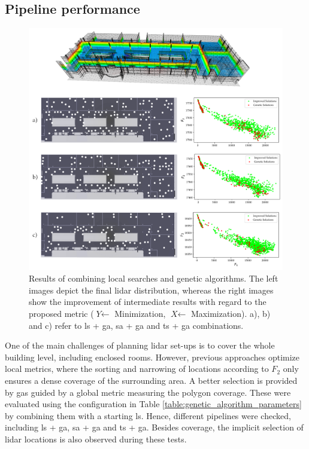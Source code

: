 \subsection{Pipeline performance}

\begin{figure}
    \centering
    \includegraphics[width=.88\linewidth]{figs/lidar_optimization/ga_results.png}
	\caption{Results of combining local searches and genetic algorithms. The left images depict the final \acrshort{lidar} distribution, whereas the right images show the improvement of intermediate results with regard to the proposed metric ($\textit{Y} \gets$ Minimization, $\textit{X} \gets$ Maximization). a), b) and c) refer to \acrshort{ls} + \acrshort{ga}, \acrshort{sa} + \acrshort{ga} and \acrshort{ts} + \acrshort{ga} combinations. }
	\label{fig:genetic_results}
\end{figure}

One of the main challenges of planning \acrshort{lidar} set-ups is to cover the whole building level, including enclosed rooms. However, previous approaches optimize local metrics, where the sorting and narrowing of locations according to $F_2$ only ensures a dense coverage of the surrounding area. A better selection is provided by \acrshort{ga}s guided by a global metric measuring the polygon coverage. These were evaluated using the configuration in Table \ref{table:genetic_algorithm_parameters} by combining them with a starting \acrshort{ls}. Hence, different pipelines were checked, including \acrshort{ls} + \acrshort{ga}, \acrshort{sa} + \acrshort{ga} and \acrshort{ts} + \acrshort{ga}. Besides coverage, the implicit selection of \acrshort{lidar} locations is also observed during these tests.

